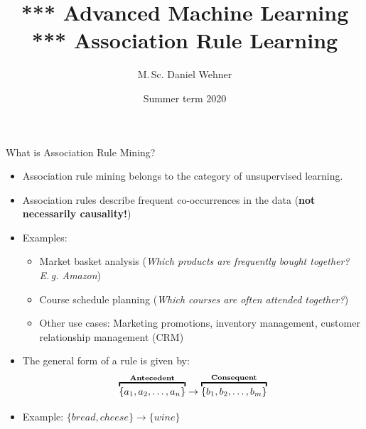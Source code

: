 




\title[Association Rule Learning]{*** Advanced Machine Learning *** Association Rule Learning}
\author{M.\,Sc. Daniel Wehner}
\date{Summer term 2020}




\dwPrintTitle

\dwPrintToc


\begin{dwHeaderFrame}{What is Association Rule Mining?}
	\begin{itemize}
		\item Association rule mining belongs to the category of unsupervised learning.
		\item Association rules describe frequent co-occurrences in the data (\textbf{not necessarily causality!})
		\item Examples:
		\begin{itemize}
			\item Market basket analysis (\textit{Which products are frequently bought together? E.\,g. Amazon})
			\item Course schedule planning (\textit{Which courses are often attended together?})
			\item Other use cases: Marketing promotions, inventory management, customer relationship management (CRM) 
		\end{itemize}
		\item The general form of a rule is given by:
		\begin{equation}
			\overbracket{\{a_1, a_2, \dots, a_n\}}^{\text{\textbf{Antecedent}}} 
			\rightarrow 
			\overbracket{\{b_1, b_2, \dots, b_m\}}^{\text{\textbf{Consequent}}}
		\end{equation}
		\item Example: $\{ bread, cheese \} \rightarrow \{ wine \}$
	\end{itemize}
\end{dwHeaderFrame}


